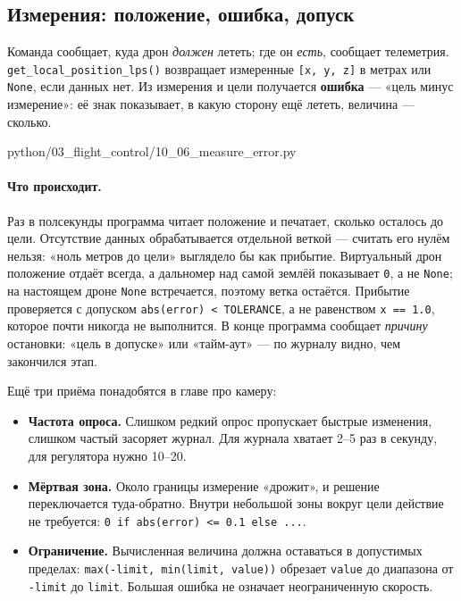 \subsection{Измерения: положение, ошибка, допуск}
\label{sec:python-measure}

Команда сообщает, куда дрон \emph{должен} лететь; где он \emph{есть}, сообщает телеметрия. \verb|get_local_position_lps()| возвращает измеренные \verb|[x, y, z]| в метрах или \verb|None|, если данных нет. Из измерения и цели получается \textbf{ошибка} --- «цель минус измерение»: её знак показывает, в какую сторону ещё лететь, величина --- сколько.

\begin{codefile}[python]{python/03_flight_control/10_06_measure_error.py}
\end{codefile}

\paragraph{Что происходит.} Раз в полсекунды программа читает положение и печатает, сколько осталось до цели. Отсутствие данных обрабатывается отдельной веткой --- считать его нулём нельзя: «ноль метров до цели» выглядело бы как прибытие. Виртуальный дрон положение отдаёт всегда, а дальномер над самой землёй показывает \texttt{0}, а не \texttt{None}; на настоящем дроне \texttt{None} встречается, поэтому ветка остаётся. Прибытие проверяется с допуском \verb|abs(error) < TOLERANCE|, а не равенством \verb|x == 1.0|, которое почти никогда не выполнится. В конце программа сообщает \emph{причину} остановки: «цель в допуске» или «тайм-аут» --- по журналу видно, чем закончился этап.

Ещё три приёма понадобятся в главе про камеру:
\begin{itemize}
    \item \textbf{Частота опроса.} Слишком редкий опрос пропускает быстрые изменения, слишком частый засоряет журнал. Для журнала хватает 2--5 раз в секунду, для регулятора нужно 10--20.
    \item \textbf{Мёртвая зона.} Около границы измерение «дрожит», и решение переключается туда-обратно. Внутри небольшой зоны вокруг цели действие не требуется: \verb|0 if abs(error) <= 0.1 else ...|.
    \item \textbf{Ограничение.} Вычисленная величина должна оставаться в допустимых пределах: \verb|max(-limit, min(limit, value))| обрезает \verb|value| до диапазона от \verb|-limit| до \verb|limit|. Большая ошибка не означает неограниченную скорость.
\end{itemize}

